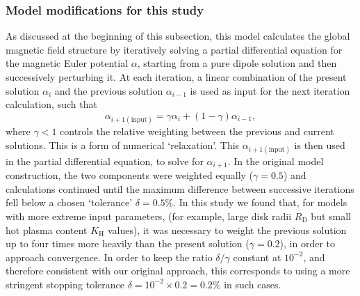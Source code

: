 \subsubsection{Model modifications for this study}\label{equinox:sec:modmodifications}
As discussed at the beginning of this subsection, this model calculates the global magnetic field structure by iteratively solving a partial differential equation for the magnetic Euler potential $\alpha$, starting from a pure dipole solution and then successively perturbing it. At each iteration, a linear combination of the present solution $\alpha_i$ and the previous solution $\alpha_{i-1}$ is used as input for the next iteration calculation, such that
\begin{equation}
\alpha_{i+1\mathrm{(input)}} = \gamma\alpha_i + (1-\gamma)\alpha_{i-1},
\end{equation}
where $\gamma<1$ controls the relative weighting between the previous and current solutions. This is a form of numerical `relaxation'. This $\alpha_{i+1(\mathrm{input})}$ is then used in the partial differential equation, to solve for $\alpha_{i+1}$. In the original model construction, the two components were weighted equally ($\gamma=0.5$) and calculations continued until the maximum difference between successive iterations fell below a chosen `tolerance' $\delta = 0.5\%$. In this study we found that, for models with more extreme input parameters, (for example, large disk radii $R_\mathrm{D}$ but small hot plasma content $K_\mathrm{H}$ values), it was necessary to weight the previous solution up to four times more heavily than the present solution ($\gamma=0.2$), in order to approach convergence. In order to keep the ratio $\delta/\gamma$ constant at $10^{-2}$, and therefore consistent with our original approach, this corresponds to using a more stringent stopping tolerance $\delta = 10^{-2}\times0.2 = 0.2\%$ in such cases.

